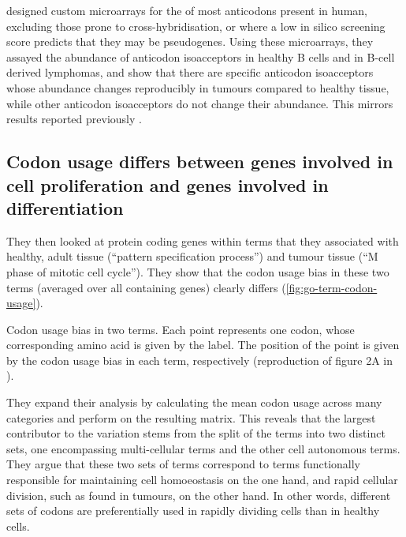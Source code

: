 \citet{Gingold:2014} designed custom microarrays for the \trna[s] of most
anticodons present in human, excluding those prone to cross-hybridi\-sation, or
where a low in silico screening score predicts that they may be pseudogenes.
Using these microarrays, they assayed the abundance of anticodon isoacceptors in
healthy B cells and in B-cell derived lymphomas, and show that there are
specific anticodon isoacceptors whose abundance changes reproducibly in tumours
compared to healthy tissue, while other anticodon isoacceptors do not change
their abundance. This mirrors results reported previously
\citep{Pavon-Eternod:2009}.

\subsection{Codon usage differs between genes involved in cell proliferation and
genes involved in differentiation}

They then looked at protein coding genes within \go terms that they associated
with healthy, adult tissue (“pattern specification process”) and tumour tissue
(“M phase of mitotic cell cycle”). They show that the codon usage bias in these
two \go terms (averaged over all containing genes) clearly differs
(\cref{fig:go-term-codon-usage}).

    {Codon usage bias in two  terms.}
    {Each point represents one codon, whose corresponding amino acid is given by
    the label. The position of the point is given by the codon usage bias in
    each \go term, respectively (reproduction of figure 2A in
    \citet{Gingold:2014}).}

They expand their analysis by calculating the mean codon usage across many \go
categories and perform \pca on the resulting matrix. This reveals that the
largest contributor to the variation stems from the split of the \go terms into
two distinct sets, one encompassing multi-cellular \go terms and the other cell
autonomous \go terms. They argue that these two sets of \go terms correspond to
\go terms functionally responsible for maintaining cell homoeostasis on the one
hand, and rapid cellular division, such as found in tumours, on the other hand.
In other words, different sets of codons are preferentially used in rapidly
dividing cells than in healthy cells.

